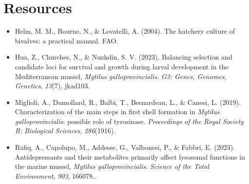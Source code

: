 \documentclass[10pt]{report}
\begin{document}
\section*{\textendash{} Resources \textendash{}}

\begin{itemize}
	\item Helm, M. M., Bourne, N., \& Lovatelli, A. (2004). The hatchery culture of bivalves: a practical manual. FAO.
	\item Hua, Z., Churches, N., \& Nuzhdin, S. V. (2023). Balancing selection and candidate loci for survival and growth during larval development in the Mediterranean mussel, \textit{Mytilus galloprovincialis}. \textit{G3: Genes, Genomes, Genetics}, \textit{13}(7), jkad103. 
	\item Miglioli, A., Dumollard, R., Balbi, T., Besnardeau, L., \& Canesi, L. (2019). Characterization of the main steps in first shell formation in \textit{Mytilus galloprovincialis}: possible role of tyrosinase. \textit{Proceedings of the Royal Society B: Biological Sciences}, \textit{286}(1916). 
	\item Rafiq, A., Capolupo, M., Addesse, G., Valbonesi, P., \& Fabbri, E. (2023). Antidepressants and their metabolites primarily affect lysosomal functions in the marine mussel, \textit{Mytilus galloprovincialis}. \textit{Science of the Total Environment}, \textit{903}, 166078.. 
\end{itemize}
\end{document}
